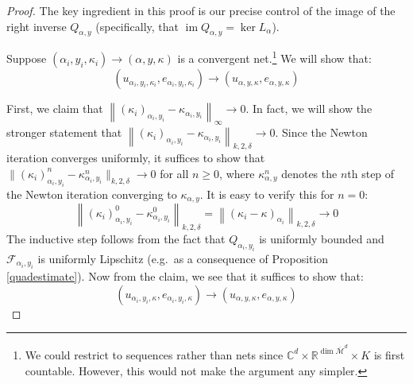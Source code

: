 \documentclass[12pt]{article}
\theoremstyle{definition}
\theoremstyle{remark}
\numberwithin{equation}{subsection}
\newcommand{\F}{\mathcal F}
\newcommand{\CC}{\mathbb C}
\newcommand{\RR}{\mathbb R}
\newcommand{\Mbar}{\overline{\mathcal M}}
\newcommand{\im}{\operatorname{im}}
\begin{document}
\begin{proof}
The key ingredient in this proof is our precise control of the image of the right inverse $Q_{\alpha,y}$ (specifically, that $\im Q_{\alpha,y}=\ker L_\alpha$).

Suppose $(\alpha_i,y_i,\kappa_i)\to(\alpha,y,\kappa)$ is a convergent net.\footnote{We could restrict to sequences rather than nets since $\CC^d\times\RR^{\dim\Mbar^d}\times K$ is first countable.  However, this would not make the argument any simpler.}  We will show that:
\begin{equation}
(u_{\alpha_i,y_i,\kappa_i},e_{\alpha_i,y_i,\kappa_i})\to(u_{\alpha,y,\kappa},e_{\alpha,y,\kappa})
\end{equation}

First, we claim that $\left\|(\kappa_i)_{\alpha_i,y_i}-\kappa_{\alpha_i,y_i}\right\|_\infty\to 0$.  In fact, we will show the stronger statement that $\left\|(\kappa_i)_{\alpha_i,y_i}-\kappa_{\alpha_i,y_i}\right\|_{k,2,\delta}\to 0$.  Since the Newton iteration converges uniformly, it suffices to show that $\bigl\|(\kappa_i)_{\alpha_i,y_i}^{n}-\kappa_{\alpha_i,y_i}^{n}\bigr\|_{k,2,\delta}\to 0$ for all $n\geq 0$, where $\kappa_{\alpha,y}^{n}$ denotes the $n$th step of the Newton iteration converging to $\kappa_{\alpha,y}$.  It is easy to verify this for $n=0$:
\begin{equation}
\left\|(\kappa_i)_{\alpha_i,y_i}^{0}-\kappa_{\alpha_i,y_i}^{0}\right\|_{k,2,\delta}=\left\|(\kappa_i-\kappa)_{\alpha_i}\right\|_{k,2,\delta}\to 0
\end{equation}
The inductive step follows from the fact that $Q_{\alpha_i,y_i}$ is uniformly bounded and $\F_{\alpha_i,y_i}$ is uniformly Lipschitz (e.g.\ as a consequence of Proposition \ref{quadestimate}).  Now from the claim, we see that it suffices to show that:
\begin{equation}
(u_{\alpha_i,y_i,\kappa},e_{\alpha_i,y_i,\kappa})\to(u_{\alpha,y,\kappa},e_{\alpha,y,\kappa})
\end{equation}


\end{proof}
\end{document}

